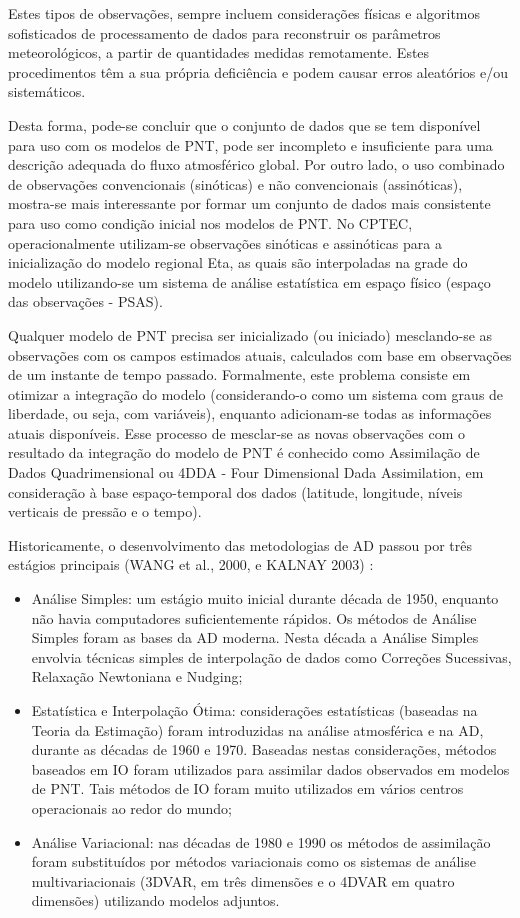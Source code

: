 Estes tipos de observações, sempre incluem considerações físicas e algoritmos sofisticados de processamento de dados para reconstruir os parâmetros meteorológicos, a partir de quantidades medidas remotamente. Estes procedimentos têm a sua própria deficiência e podem causar erros aleatórios e/ou sistemáticos.

Desta forma, pode-se concluir que o conjunto de dados que se tem disponível para uso com os modelos de PNT, pode ser incompleto e insuficiente para uma descrição adequada do fluxo atmosférico global. Por outro lado, o uso combinado de observações convencionais (sinóticas) e não convencionais (assinóticas), mostra-se mais interessante por formar um conjunto de dados mais consistente para uso como condição inicial nos modelos de PNT. No CPTEC, operacionalmente utilizam-se observações sinóticas e assinóticas para a inicialização do modelo regional Eta, as quais são interpoladas na grade do modelo utilizando-se um sistema de análise estatística em espaço físico (espaço das observações - PSAS).

Qualquer modelo de PNT precisa ser inicializado (ou iniciado) mesclando-se as observações com os campos estimados atuais, calculados com base em observações de um instante de tempo passado. Formalmente, este problema consiste em otimizar a integração do modelo (considerando-o como um sistema com  graus de liberdade, ou seja, com  variáveis), enquanto adicionam-se todas as informações atuais disponíveis. Esse processo de mesclar-se as novas observações com o resultado da integração do modelo de PNT é conhecido como Assimilação de Dados Quadrimensional ou 4DDA - Four Dimensional Dada Assimilation, em consideração à base espaço-temporal dos dados (latitude, longitude, níveis verticais de pressão e o tempo).

Historicamente, o desenvolvimento das metodologias de AD passou por três estágios principais (WANG et al., 2000, e KALNAY 2003) :

\begin{itemize}
\item Análise Simples: um estágio muito inicial durante década de 1950, enquanto não havia computadores suficientemente rápidos. Os métodos de Análise Simples foram as bases da AD moderna. Nesta década a Análise Simples envolvia técnicas simples de interpolação de dados como Correções Sucessivas, Relaxação Newtoniana e Nudging;
\item Estatística e Interpolação Ótima: considerações estatísticas (baseadas na Teoria da Estimação) foram introduzidas na análise atmosférica e na AD, durante as décadas de 1960 e 1970. Baseadas nestas considerações, métodos baseados em IO foram utilizados para assimilar dados observados em modelos de PNT. Tais métodos de IO foram muito utilizados em vários centros operacionais ao redor do mundo;
\item Análise Variacional: nas décadas de 1980 e 1990 os métodos de assimilação foram substituídos por métodos variacionais como os sistemas de análise multivariacionais (3DVAR, em três dimensões e o 4DVAR em quatro dimensões) utilizando modelos adjuntos. 
\end{itemize}

